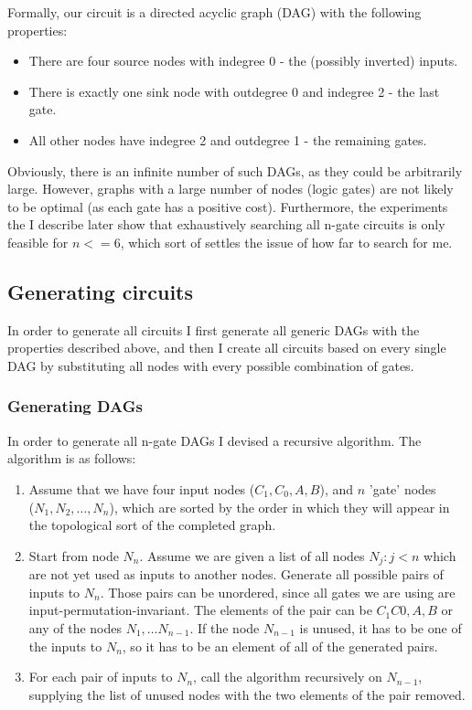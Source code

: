 \documentclass[12pt]{article}
\begin{document}
Formally, our circuit is a directed acyclic graph (DAG) with the following properties:
\begin {itemize}
  \item There are four source nodes with indegree 0 - the (possibly inverted) inputs.
  \item There is exactly one sink node with outdegree 0 and indegree 2 - the last gate.
  \item All other nodes have indegree 2 and outdegree 1 - the remaining gates.
\end {itemize}

Obviously, there is an infinite number of such DAGs, as they could be arbitrarily large. However,
graphs with a large number of nodes (logic gates) are not likely to be optimal (as each gate has a positive cost).
Furthermore, the experiments the I describe later show that exhaustively searching all n-gate circuits
is only feasible for $n<=6$, which sort of settles the issue of how far to search for me.

 
\subsection { Generating circuits }

In order to generate all circuits I first generate all generic DAGs with the properties described
above, and then I create all circuits based on every single DAG by substituting all nodes with every
possible combination of gates. 

\subsubsection {Generating DAGs}

In order to generate all n-gate DAGs I devised a recursive algorithm. The algorithm is as follows:

\begin {enumerate}
  \item Assume that we have four input nodes ($C_1, C_0, A, B$), and $n$ 'gate' nodes \\ ($N_1, N_2, \ldots, N_n$),
  which are sorted by the order in which they will appear in the topological sort of the completed graph.
  
  \item Start from node $N_n$. Assume we are given a list of all nodes $N_j : j < n$ which are not yet used as
  inputs to another nodes. Generate all possible pairs of inputs to $N_n$. Those pairs can be unordered, 
  since all gates we are using are input-permutation-invariant. The elements of the pair can be $C_1 C0, A, B$ or
  any of the nodes $N_1, \ldots N_{n-1}$. If the node $N_{n-1}$ is unused, it has to be one of the inputs to $N_n$,
  so it has to be an element of all of the generated pairs.

  \item For each pair of inputs to $N_n$, call the algorithm recursively on $N_{n-1}$, supplying the list of unused
  nodes with the two elements of the pair removed.
\end{enumerate}
\end{document}
